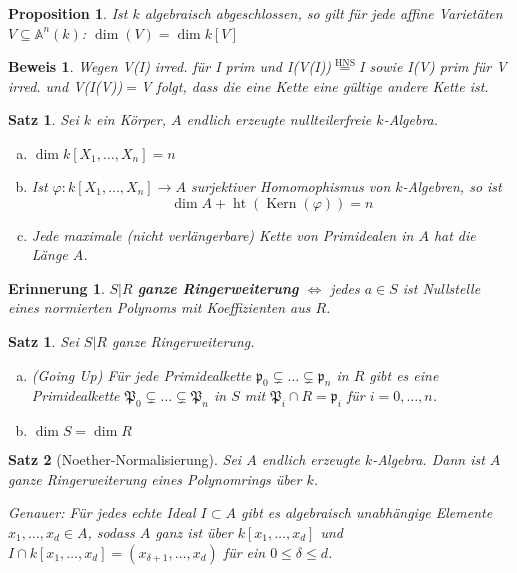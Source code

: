 \documentclass[a4paper, 12pt, numbers=noendperiod, chapterprefix=true, headsepline]{scrbook}
\theoremstyle{break}
\newtheorem{Satz}{Satz}
\newtheorem{UnterSatz}{Satz}[Satz]
\newtheorem{Prop}[Def]{Proposition}
\theoremstyle{nonumberbreak}
\newtheorem{nnErinn}{Erinnerung}
\newtheorem{Bew}{Beweis}
\theoremstyle{nonumberplain}
\newcommand{\quot}[1]{\textrm{\glqq}{#1}\textrm{\grqq}}
\newcommand{\emp}[1]{\textbf{\emph{#1}}}
\newcommand{\deftermspec}[2]{{\index{#2}}\emp{#1}}
\DeclareMathOperator{\Kern}{Kern}
\DeclareMathOperator{\Ht}{ht}
\newcommand{\A}{\mathbb{A}}
\begin{document}
\begin{Prop}
Ist $k$ algebraisch abgeschlossen, so gilt f\"ur jede affine Variet\"aten $V\subseteq\A^n(k)$: $\dim(V)=\dim k[V]$
\end{Prop}

\begin{Bew}
Wegen V(I) irred. für I prim und I(V(I))$\overset{\textrm{HNS}}{=}$I sowie I(V) prim für V irred. und V(I(V))$=$V folgt, dass die eine Kette eine gültige andere Kette ist.
\end{Bew}

\begin{Satz}
Sei $k$ ein K\"orper, $A$ endlich erzeugte nullteilerfreie $k$-Algebra.\begin{enumerate}[a)]
\item
	$\dim k[X_1,\ldots ,X_n]=n$
\item
	Ist $\varphi:k[X_1,\ldots ,X_n]\to A$ surjektiver Homomophismus von $k$-Algebren, so ist \[\dim A +\Ht(\Kern(\varphi))=n\]
\item
	Jede maximale (nicht verl\"angerbare) Kette von Primidealen in $A$ hat die L\"ange $A$.
\end{enumerate}\end{Satz}

\begin{nnErinn}
$S|R$ \deftermspec{ganze Ringerweiterung}{Ring!-erweiterung!ganze} $\Leftrightarrow$ jedes $a\in S$ ist Nullstelle eines \emph{normierten} Polynoms mit Koeffizienten aus $R$.
\end{nnErinn}

\begin{UnterSatz}\label{satz9.1}
Sei $S|R$ ganze Ringerweiterung.\begin{enumerate}[a)]
\item\label{satz9.1a}
	(\quot{Going Up}) F\"ur jede Primidealkette $\mathfrak p_0\subsetneq\ldots \subsetneq \mathfrak p_n$ in $R$ gibt es eine Primidealkette $\mathfrak P_0\subsetneq\ldots \subsetneq \mathfrak P_n$ in $S$ mit $\mathfrak P_i\cap R=\mathfrak p_i$ f\"ur $i=0,\ldots ,n$.
\item
	$\dim S = \dim R$
\end{enumerate}\end{UnterSatz}

\begin{UnterSatz}[\quot{Noether-Normalisierung}]
Sei $A$ endlich erzeugte $k$-Algebra. Dann ist $A$ ganze Ringerweiterung eines Polynomrings \"uber $k$.

\emph{Genauer:} F\"ur jedes echte Ideal $I\subset A$ gibt es algebraisch unabh\"angige Elemente $x_1,\ldots ,x_d\in A$, sodass $A$ ganz ist \"uber $k[x_1,\ldots ,x_d]$ und $I\cap k[x_1,\ldots ,x_d]=(x_{\delta+1},\ldots ,x_d)$ f\"ur ein $0\le\delta\le d$.
\end{UnterSatz}
\end{document}
